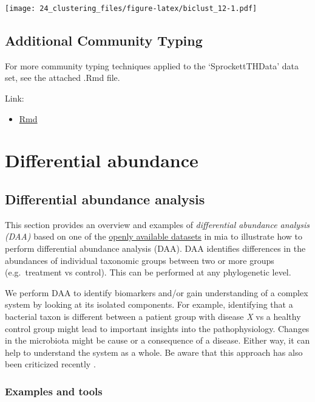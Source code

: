 \documentclass[
]{book}
\providecommand{\tightlist}{%
  \setlength{\itemsep}{0pt}\setlength{\parskip}{0pt}}
\begin{document}
\texttt{[image: 24\_clustering\_files/figure-latex/biclust\_12-1.pdf]}

\hypertarget{additional-community-typing}{%
\section{Additional Community Typing}\label{additional-community-typing}}

For more community typing techniques applied to the `SprockettTHData'
data set, see the attached .Rmd file.

Link:

\begin{itemize}
\tightlist
\item
  \href{add-comm-typing.Rmd}{Rmd}
\end{itemize}

\hypertarget{differential-abundance}{%
\chapter{Differential abundance}\label{differential-abundance}}

\hypertarget{differential-abundance-analysis}{%
\section{Differential abundance analysis}\label{differential-abundance-analysis}}

This section provides an overview and examples of \emph{differential
abundance analysis (DAA)} based on one of the \href{https://microbiome.github.io/mia/reference/mia-datasets.html}{openly available
datasets}
in mia to illustrate how to perform differential abundance analysis
(DAA). DAA identifies differences in the abundances of individual
taxonomic groups between two or more groups (e.g.~treatment vs
control). This can be performed at any phylogenetic level.

We perform DAA to identify biomarkers and/or gain understanding of a
complex system by looking at its isolated components. For example,
identifying that a bacterial taxon is different between a patient
group with disease \emph{X} vs a healthy control group might lead to
important insights into the pathophysiology. Changes in the microbiota
might be cause or a consequence of a disease. Either way, it can
help to understand the system as a whole. Be aware that this approach
has also been criticized recently \citep{Quinn2021}.

\hypertarget{examples-and-tools}{%
\subsection{Examples and tools}\label{examples-and-tools}}
\end{document}
